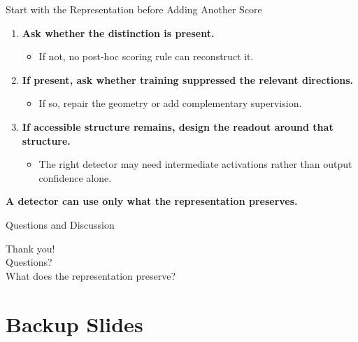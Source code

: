 \documentclass[aspectratio=1610]{beamer}
\newcommand{\sectionpubinfo}{}
\begin{document}
\begin{frame}{Start with the Representation before Adding Another Score}
\begin{enumerate}
  \item \textbf{Ask whether the distinction is present.}
  \begin{itemize}
    \item If not, no post-hoc scoring rule can reconstruct it.
  \end{itemize}
  \item \textbf{If present, ask whether training suppressed the relevant directions.}
  \begin{itemize}
    \item If so, repair the geometry or add complementary supervision.
  \end{itemize}
  \item \textbf{If accessible structure remains, design the readout around that structure.}
  \begin{itemize}
    \item The right detector may need intermediate activations rather than output confidence alone.
  \end{itemize}
\end{enumerate}

\vfill
\begin{center}
  \LARGE \textbf{A detector can use only what the representation preserves.}
\end{center}
\end{frame}

\begin{frame}{Questions and Discussion}
\begin{center}
  \vspace{1.0cm}
  \Huge Thank you!\\[1.0cm]
  \Large Questions?\\[0.9cm]
  \normalsize What does the representation preserve?
\end{center}
\end{frame}


\appendix
\renewcommand{\sectionpubinfo}{\hspace{1ex}(Backup)}
\section{Backup Slides}
\end{document}
